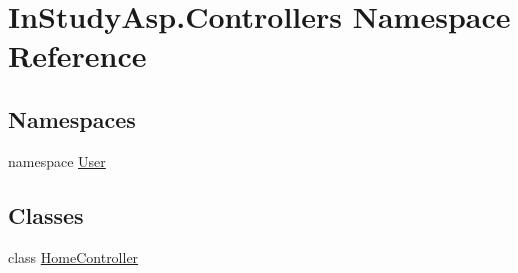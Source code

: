 \hypertarget{namespace_in_study_asp_1_1_controllers}{}\section{In\+Study\+Asp.\+Controllers Namespace Reference}
\label{namespace_in_study_asp_1_1_controllers}
\subsection*{Namespaces}
\begin{DoxyCompactItemize}
\item 
namespace \hyperlink{namespace_in_study_asp_1_1_controllers_1_1_user}{User}
\end{DoxyCompactItemize}
\subsection*{Classes}
\begin{DoxyCompactItemize}
\item 
class \hyperlink{class_in_study_asp_1_1_controllers_1_1_home_controller}{Home\+Controller}
\end{DoxyCompactItemize}
